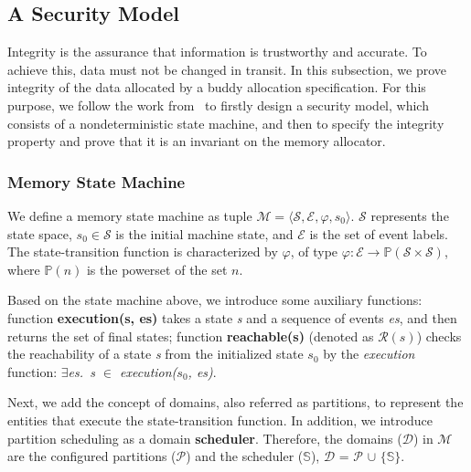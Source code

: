 %
%

\subsection{A Security Model}\label{sec:securitymodel}
Integrity is the assurance that information is trustworthy and accurate. To achieve this, data must not be changed in transit. In this subsection, we prove integrity of  the data allocated by a buddy allocation specification. For this purpose, we follow the work from~\cite{reg_securitymodel} to firstly design a security model, which consists of a nondeterministic state machine, and then to specify the integrity property and prove that it is an invariant on the memory allocator.

\subsubsection{Memory State Machine}
We define a memory state machine as tuple $\mathcal{M} = \langle \mathcal{S}, \mathcal{E}, \varphi, s_0 \rangle$. $\mathcal{S}$ represents the state space,  $s_0 \in \mathcal{S}$ is the initial machine state, and $\mathcal{E}$ is the set of event labels. The state-transition function is characterized by $\varphi$, of type $\varphi: \mathcal{E} \rightarrow \mathbb{P}(\mathcal{S} \times \mathcal{S})$, where $\mathbb{P}(n)$ is the powerset of the set $n$.

Based on the state machine above, we introduce some auxiliary functions: function \textbf{execution(s, es)} takes a state \emph{s} and a sequence of events \emph{es}, and then returns the set of final states; function \textbf{reachable(s)} (denoted as $\mathcal{R}(s)$) checks the reachability of a state \emph{s} from the initialized state $s_0$ by the \emph{execution} function: \emph{$\exists$es.\ s $\in$ execution($s_0$, es)}.

Next, we add the concept of domains, also referred as partitions, to represent the entities that execute the state-transition function. In addition, we introduce partition scheduling as a domain \textbf{scheduler}. Therefore, the domains ($\mathcal{D}$) in $\mathcal{M}$ are the configured partitions ($\mathcal{P}$) and the scheduler ($\mathbb{S}$), $\mathcal{D}$ = $\mathcal{P}$ $\cup$ $\lbrace$$\mathbb{S}$$\rbrace$.

